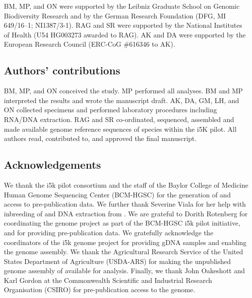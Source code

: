 BM, MP, and ON were supported by the Leibniz Graduate School on Genomic
Biodiversity Research and by the German Research Foundation (DFG, MI
649/16--1; NI1387/3-1). RAG and SR were supported by the National
Institutes of Health (U54 HG003273 awarded to RAG). AK and DA were
supported by the European Research Council (ERC-CoG \#616346 to AK).

\subsection{Authors' contributions}\label{authors-contributions}

BM, MP, and ON conceived the study. MP performed all analyses. BM and MP
interpreted the results and wrote the manuscript draft. AK, DA, GM, LH,
and ON collected specimens and performed laboratory procedures including
RNA/DNA extraction. RAG and SR co-ordinated, sequenced, assembled and
made available genome reference sequences of species within the i5K
pilot. All authors read, contributed to, and approved the final
manuscript.

\subsection{Acknowledgements}\label{acknowledgements}

We thank the i5k pilot consortium and the staff of the Baylor College of
Medicine Human Genome Sequencing Center (BCM-HGSC) for the generation of
and access to pre-publication data. We further thank Severine Viala for
her help with inbreeding of and DNA extraction from .
We are grateful to Dorith Rotenberg for coordinating the  genome project as part of the BCM-HGSC i5k pilot
initiative, and for providing pre-publication data. We gratefully
acknowledge the coordinators of the i5k  genome
project for providing gDNA samples and enabling the genome assembly. We
thank the Agricultural Research Service of the United States Department
of Agriculture (USDA-ARS) for making the unpublished genome assembly of
 available for analysis. Finally, we thank John
Oakeshott and Karl Gordon at the Commonwealth Scientific and Industrial
Research Organisation (CSIRO) for pre-publication access to the
 genome.
